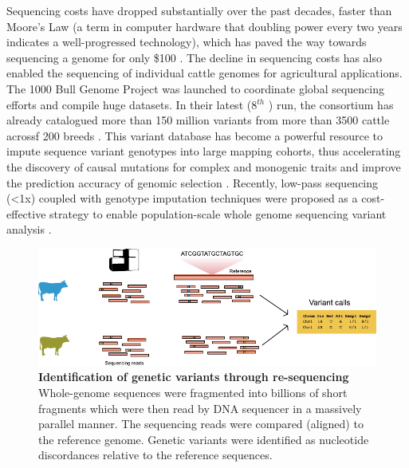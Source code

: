 \documentclass[../main.tex]{subfiles}
\begin{document}
Sequencing costs have dropped substantially over the past decades, faster than Moore’s Law (a term in computer hardware that doubling power every two years indicates a well-progressed technology), which has paved the way towards sequencing a genome for only \$100 \citep{Regalado2020,Wetterstrand2020}. The decline in sequencing costs has also enabled the sequencing of individual cattle genomes for agricultural applications. The 1000 Bull Genome Project was launched to coordinate global sequencing efforts and compile huge datasets.  In their latest  (8$^{th}$ ) run, the consortium has already catalogued more than 150 million variants from more than 3500 cattle acrossf 200 breeds \citep{hayes20191000}. This variant database has become a powerful resource to impute sequence variant genotypes into large mapping cohorts, thus accelerating the discovery of causal mutations  for complex and monogenic traits and improve the prediction accuracy of genomic selection \citep{daetwyler2014whole}. Recently, low-pass sequencing (<1x) coupled with genotype imputation techniques were proposed as a cost-effective strategy to enable population-scale whole genome sequencing variant analysis \citep{snelling2020assessment}. \\

\bigskip

\begin{figure}[!htb]
    \centering
    \includegraphics[width=\textwidth]{intro/fig1.pdf}
        \vspace{3mm}
        \caption[Identification of genetic variants through re-sequencing]{\textbf{Identification of genetic variants through re-sequencing} \\
        \footnotesize{Whole-genome sequences were fragmented into billions of short fragments which were then read by DNA sequencer in a massively parallel manner. The sequencing reads were compared (aligned) to the reference genome. Genetic variants were identified as nucleotide discordances relative to the reference sequences.}}
        \label{fig11:reseq}
\end{figure}
\end{document}
